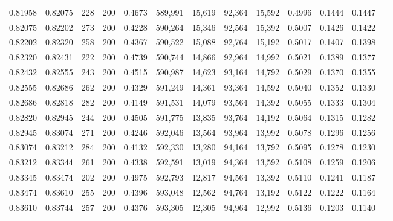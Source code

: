 \begin{tabular}{rrrrrrrrrrrrr}
0.81958 & 0.82075 &    228 & 200 &                                     0.4673 & 589,991 &  15,619 &  92,364 &  15,592 & 0.4996 & 0.1444 & 0.1447 \\
0.82075 & 0.82202 &    273 & 200 &                                     0.4228 & 590,264 &  15,346 &  92,564 &  15,392 & 0.5007 & 0.1426 & 0.1422 \\
0.82202 & 0.82320 &    258 & 200 &                                     0.4367 & 590,522 &  15,088 &  92,764 &  15,192 & 0.5017 & 0.1407 & 0.1398 \\
0.82320 & 0.82431 &    222 & 200 &                                     0.4739 & 590,744 &  14,866 &  92,964 &  14,992 & 0.5021 & 0.1389 & 0.1377 \\
0.82432 & 0.82555 &    243 & 200 &                                     0.4515 & 590,987 &  14,623 &  93,164 &  14,792 & 0.5029 & 0.1370 & 0.1355 \\
0.82555 & 0.82686 &    262 & 200 &                                     0.4329 & 591,249 &  14,361 &  93,364 &  14,592 & 0.5040 & 0.1352 & 0.1330 \\
0.82686 & 0.82818 &    282 & 200 &                                     0.4149 & 591,531 &  14,079 &  93,564 &  14,392 & 0.5055 & 0.1333 & 0.1304 \\
0.82820 & 0.82945 &    244 & 200 &                                     0.4505 & 591,775 &  13,835 &  93,764 &  14,192 & 0.5064 & 0.1315 & 0.1282 \\
0.82945 & 0.83074 &    271 & 200 &                                     0.4246 & 592,046 &  13,564 &  93,964 &  13,992 & 0.5078 & 0.1296 & 0.1256 \\
0.83074 & 0.83212 &    284 & 200 &                                     0.4132 & 592,330 &  13,280 &  94,164 &  13,792 & 0.5095 & 0.1278 & 0.1230 \\
0.83212 & 0.83344 &    261 & 200 &                                     0.4338 & 592,591 &  13,019 &  94,364 &  13,592 & 0.5108 & 0.1259 & 0.1206 \\
0.83345 & 0.83474 &    202 & 200 &                                     0.4975 & 592,793 &  12,817 &  94,564 &  13,392 & 0.5110 & 0.1241 & 0.1187 \\
0.83474 & 0.83610 &    255 & 200 &                                     0.4396 & 593,048 &  12,562 &  94,764 &  13,192 & 0.5122 & 0.1222 & 0.1164 \\
0.83610 & 0.83744 &    257 & 200 &                                     0.4376 & 593,305 &  12,305 &  94,964 &  12,992 & 0.5136 & 0.1203 & 0.1140 \\

\end{tabular}
